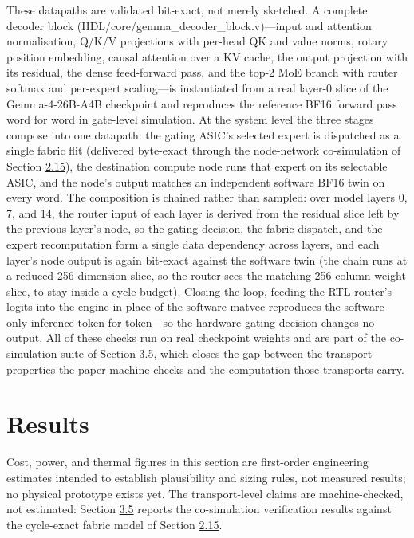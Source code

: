 \documentclass[10pt,twocolumn]{article}
\begin{document}
These datapaths are validated bit-exact, not merely sketched. A complete decoder block (HDL/core/gemma\_decoder\_block.v)---input and attention normalisation, Q/K/V projections with per-head QK and value norms, rotary position embedding, causal attention over a KV cache, the output projection with its residual, the dense feed-forward pass, and the top-2 MoE branch with router softmax and per-expert scaling---is instantiated from a real layer-0 slice of the Gemma-4-26B-A4B checkpoint and reproduces the reference BF16 forward pass word for word in gate-level simulation. At the system level the three stages compose into one datapath: the gating ASIC's selected expert is dispatched as a single fabric flit (delivered byte-exact through the node-network co-simulation of Section \hyperref[sec:2.15]{2.15}), the destination compute node runs that expert on its selectable ASIC, and the node's output matches an independent software BF16 twin on every word. The composition is chained rather than sampled: over model layers 0, 7, and 14, the router input of each layer is derived from the residual slice left by the previous layer's node, so the gating decision, the fabric dispatch, and the expert recomputation form a single data dependency across layers, and each layer's node output is again bit-exact against the software twin (the chain runs at a reduced 256-dimension slice, so the router sees the matching 256-column weight slice, to stay inside a cycle budget). Closing the loop, feeding the RTL router's logits into the engine in place of the software matvec reproduces the software-only inference token for token---so the hardware gating decision changes no output. All of these checks run on real checkpoint weights and are part of the co-simulation suite of Section \hyperref[sec:3.5]{3.5}, which closes the gap between the transport properties the paper machine-checks and the computation those transports carry.

\section*{Results}\label{sec:results}

Cost, power, and thermal figures in this section are first-order engineering estimates intended to establish plausibility and sizing rules, not measured results; no physical prototype exists yet. The transport-level claims are machine-checked, not estimated: Section \hyperref[sec:3.5]{3.5} reports the co-simulation verification results against the cycle-exact fabric model of Section \hyperref[sec:2.15]{2.15}.
\end{document}

